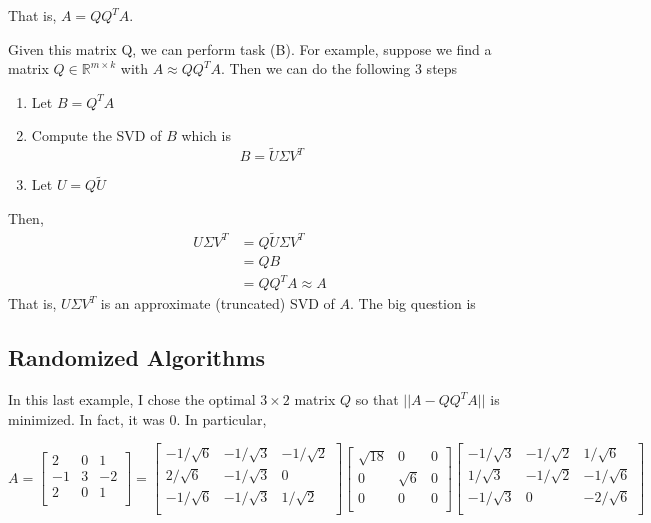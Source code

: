 That is, $A=QQ^TA$.

Given this matrix Q, we can perform task (B). For example, suppose we find a matrix $Q\in\mathbb{R}^{m\times k}$ with $A\approx QQ^TA$. Then we can do the following 3 steps
\begin{enumerate}[1)]
    \item Let $B=Q^TA$
    \item Compute the SVD of $B$ which is
    \begin{equation*}
        B = \widetilde{U}\Sigma V^T
    \end{equation*}
    \item Let $U=Q\widetilde{U}$
\end{enumerate}
Then,
\begin{align*}
U\Sigma V^T &= Q\widetilde{U} \Sigma V^T\\
&=QB\\
&=QQ^TA \approx A
\end{align*}
That is, $U\Sigma V^T$ is an approximate (truncated) SVD of $A$. The big question is

\begin{center}
\end{center}


\subsection{Randomized Algorithms}
In this last example, I chose the optimal $3\times 2$ matrix $Q$ so that $||A-QQ^TA||$ is minimized. In fact, it was 0. In particular,


\begin{equation*}
A =
\begin{bmatrix}
    2 & 0 & 1 \\
    -1 & 3 & -2 \\
    2 & 0 & 1 \\
\end{bmatrix} =
\begin{bmatrix}
    -1/\sqrt{6} & -1/\sqrt{3}& -1/\sqrt{2} \\
    2/\sqrt{6} & -1/\sqrt{3} & 0 \\
    -1/\sqrt{6} & -1/\sqrt{3} & 1/\sqrt{2} \\
\end{bmatrix}
\begin{bmatrix}
    \sqrt{18} & 0 & 0 \\
    0& \sqrt{6} & 0 \\
    0& 0 & 0 \\
\end{bmatrix}
\begin{bmatrix}
     -1/\sqrt{3} & -1/\sqrt{2} & 1/\sqrt{6}\\
     1/\sqrt{3} & -1/\sqrt{2} & -1/\sqrt{6}\\
     -1/\sqrt{3} & 0           & -2/\sqrt{6}\\
\end{bmatrix}
\end{equation*}

